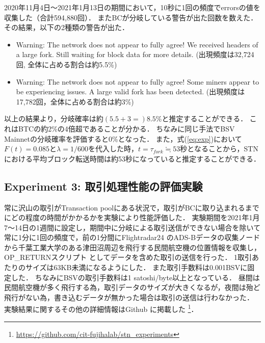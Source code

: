 \documentclass[graybox]{svmult}
\begin{document}
2020年11月4日〜2021年1月13日の期間において，10秒に1回の頻度でerrorsの値を収集した（合計594,880回）．
またBCが分岐している警告が出た回数を数えた．
その結果，以下の2種類の警告が出た．
%
\begin{itemize}
  \item Warning: The network does not appear to fully agree! We received
        headers of a large fork. Still waiting for block data for more details.
	(出現頻度は32,724回, 全体に占める割合は約5.5\%)

  \item Warning: The network does not appear to fully agree! Some miners
        appear to be experiencing issues. A large valid fork has been detected. 
	(出現頻度は17,782回，全体に占める割合は約3\%)
\end{itemize}
%
以上の結果より，分岐確率は約$(5.5+3=)8.5$\%と推定することができる．
これはBTCの約2\%の4倍超であることが分かる．
ちなみに同じ手法でBSV Mainnetの分岐確率を評価すると0\%となった．
また，式(\ref{eq:exp})において$F(t)=0.085$と$\lambda=1/600$を代入した時，$t=\tau_{fork} \fallingdotseq 53$秒となることから，STNにおける平均ブロック転送時間は約53秒になっていると推定することができる．



\subsection{Experiment 3: 取引処理性能の評価実験}
\label{sec:method}

常に沢山の取引がTransaction poolにある状況で，取引がBCに取り込まれるまでにどの程度の時間がかかるかを実験により性能評価した．
実験期間を2021年1月7〜14日の1週間に設定し，期間中に分岐による取引送信ができない場合を除いて常に1分に1回の頻度で，前の1分間にFlightradar24 \cite{flightradar24} のADS-Bデータの収集ノードから千葉工業大学のある津田沼周辺を飛行する民間航空機の位置情報を収集し，OP\_RETURNスクリプト
としてデータを含めた取引の送信を行った．
1取引あたりのサイズは63KB未満になるようにした．
また取引手数料は0.001BSVに固定した．
ちなみにBSVの取引手数料は1 satoshi/byte以上となっている．
昼間は民間航空機が多く飛行する為，取引データのサイズが大きくなるが，夜間は殆ど飛行がない為，書き込むデータが無かった場合は取引の送信は行わなかった．
実験結果に関するその他の詳細情報はGithub に掲載した
\footnote{\url{https://github.com/cit-fujihalab/stn_experiments}}．
\end{document}
